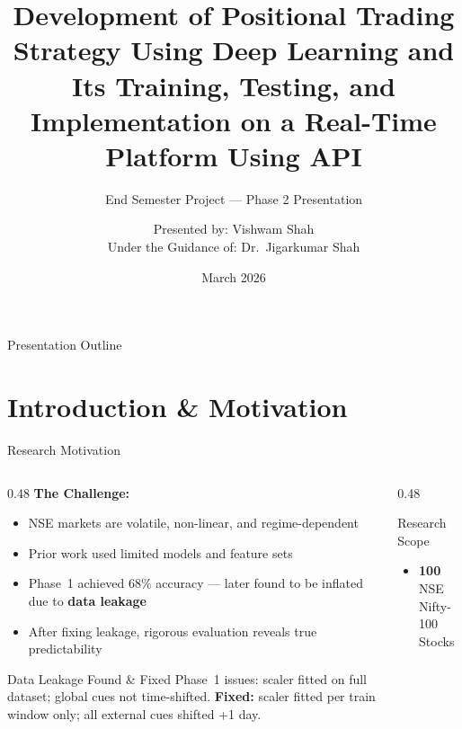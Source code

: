 \documentclass[aspectratio=43,11pt]{beamer}
\title[AI-Driven Positional Trading --- NSE]{\small\textbf{Development of Positional Trading Strategy Using Deep Learning and Its Training, Testing, and Implementation on a Real-Time Platform Using API}}
\subtitle{End Semester Project --- Phase 2 Presentation}
\author{Presented by: Vishwam Shah\\[0.15cm]
\small Under the Guidance of: Dr.~Jigarkumar Shah}
\institute{Pandit Deendayal Energy University \\ School of Technology}
\date{March 2026}
\begin{document}
\begin{frame}
    \titlepage
\end{frame}

\begin{frame}{Presentation Outline}
    \tableofcontents
\end{frame}

\section{Introduction \& Motivation}

\begin{frame}{Research Motivation}
    \begin{columns}[T]
        \begin{column}{0.48\textwidth}
            \textbf{The Challenge:}
            \begin{itemize}\footnotesize\setlength{\itemsep}{3pt}
                \item NSE markets are volatile, non-linear, and regime-dependent
                \item Prior work used limited models and feature sets
                \item Phase~1 achieved 68\% accuracy --- later found to be inflated due to \textbf{data leakage}
                \item After fixing leakage, rigorous evaluation reveals true predictability
            \end{itemize}
            \vspace{0.2cm}
            \begin{alertblock}{Data Leakage Found \& Fixed}
                \footnotesize Phase~1 issues: scaler fitted on full dataset; global cues not time-shifted. \textbf{Fixed:} scaler fitted per train window only; all external cues shifted +1 day.
            \end{alertblock}
        \end{column}
        \begin{column}{0.48\textwidth}
            \begin{block}{Research Scope}
                \footnotesize\setlength{\itemsep}{2pt}
                \begin{itemize}
                    \item \textbf{100} NSE Nifty-100 Stocks

\end{itemize}
\end{block}
\end{column}
\end{columns}
\end{frame}
\end{document}
